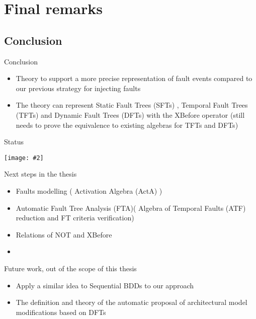 \documentclass{beamer}
\def\FTA{Fault Tree Analysis (FTA)\gdef\FTA{FTA\xspace}\xspace}
\def\SFT{%
	Static Fault Tree (SFT)%
	\gdef\SFT{SFT\xspace}%
	\gdef\SFTs{SFTs\xspace}%
	\xspace%
}
\def\SFTs{%
	Static Fault Trees (SFTs)%
	\gdef\SFT{SFT\xspace}%
	\gdef\SFTs{SFTs\xspace}%
	\xspace%
}
\def\TFT{%
	Temporal Fault Tree (TFT)%
	\gdef\TFT{TFT\xspace}%
	\gdef\TFTs{TFTs\xspace}%
	\xspace%
}
\def\TFTs{%
	Temporal Fault Trees (TFTs)%
	\gdef\TFT{TFT\xspace}%
	\gdef\TFTs{TFTs\xspace}%
	\xspace%
}
\def\DFT{%
	Dynamic Fault Tree (DFT)%
	\gdef\DFT{DFT\xspace}%
	\gdef\DFTs{DFTs\xspace}%
	\xspace%
}
\def\DFTs{%
	Dynamic Fault Trees (DFTs)%
	\gdef\DFT{DFT\xspace}%
	\gdef\DFTs{DFTs\xspace}%
	\xspace%
}
\def\ATF{%
	Algebra of Temporal Faults (ATF)%
	\gdef\ATF{ATF\xspace}%
	\gdef\iATF{an ATF\xspace}%
	\gdef\IATF{An ATF\xspace}%
	\xspace%
}
\def\iATF{%
	an Algebra of Temporal Faults (ATF)%
	\gdef\ATF{ATF\xspace}%
	\gdef\iATF{an ATF\xspace}%
	\gdef\IATF{An ATF\xspace}%
	\xspace%
}
\def\IATF{%
	An Algebra of Temporal Faults (ATF)%
	\gdef\ATF{ATF\xspace}%
	\gdef\iATF{an ATF\xspace}%
	\gdef\IATF{An ATF\xspace}%
	\xspace%
}
\def\activation{%
	Activation Algebra (ActA)%
	\gdef\activation{ActA\xspace}%
	\xspace%
}
\newcommand{\includegraphicsaspectratio}[2][1]{%
  \texttt{[image: \#2]}%
}
\begin{document}
\section{Final remarks}
\subsection{Conclusion}

\begin{frame}{Conclusion}
	\begin{itemize}
		\item Theory to support a more precise representation of fault events compared to our previous strategy for injecting faults
		\item The theory can represent \SFTs, \TFTs and \DFTs with the XBefore operator (still needs to prove the equivalence to existing algebras for \TFTs and \DFTs)
	\end{itemize}
\end{frame}

\begin{frame}{Status}
	\begin{center}
		\includegraphicsaspectratio[0.8]{StrategyOverview-Status}
	\end{center}
\end{frame}

\begin{frame}[label=nextsteps]{Next steps in the thesis}
	\begin{itemize}
		\item Faults modelling (\activation) 
		\item Automatic \FTA (\ATF reduction and FT criteria verification)
		\item Relations of NOT and XBefore
		\item \hyperlink{tasks}{}
	\end{itemize}
\end{frame}

\begin{frame}{Future work, out of the scope of this thesis}
	\begin{itemize}
		\item Apply a similar idea to Sequential BDDs to our approach
		\item The definition and theory of the automatic proposal of architectural model modifications based on \DFTs
	\end{itemize}
\end{frame}
\end{document}
